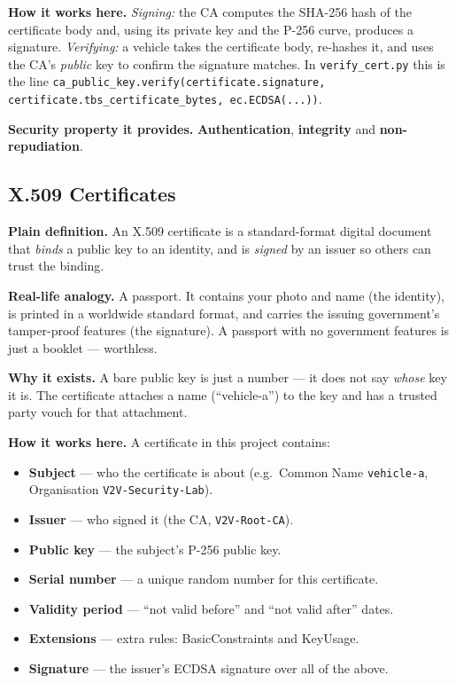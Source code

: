\documentclass[11pt,a4paper]{article}
\begin{document}
\textbf{How it works here.} \emph{Signing:} the CA computes the SHA-256 hash of
the certificate body and, using its private key and the P-256 curve, produces a
signature. \emph{Verifying:} a vehicle takes the certificate body, re-hashes it,
and uses the CA's \emph{public} key to confirm the signature matches. In
\texttt{verify\_cert.py} this is the line
\texttt{ca\_public\_key.verify(certificate.signature,
certificate.tbs\_certificate\_bytes, ec.ECDSA(...))}.

\textbf{Security property it provides.} \textbf{Authentication},
\textbf{integrity} and \textbf{non-repudiation}.

\subsection{X.509 Certificates}
\textbf{Plain definition.} An X.509 certificate is a standard-format digital
document that \emph{binds} a public key to an identity, and is \emph{signed} by
an issuer so others can trust the binding.

\textbf{Real-life analogy.} A passport. It contains your photo and name (the
identity), is printed in a worldwide standard format, and carries the issuing
government's tamper-proof features (the signature). A passport with no government
features is just a booklet --- worthless.

\textbf{Why it exists.} A bare public key is just a number --- it does not say
\emph{whose} key it is. The certificate attaches a name (``vehicle-a'') to the
key and has a trusted party vouch for that attachment.

\textbf{How it works here.} A certificate in this project contains:
\begin{itemize}
  \item \textbf{Subject} --- who the certificate is about (e.g.\ Common Name
        \texttt{vehicle-a}, Organisation \texttt{V2V-Security-Lab}).
  \item \textbf{Issuer} --- who signed it (the CA, \texttt{V2V-Root-CA}).
  \item \textbf{Public key} --- the subject's P-256 public key.
  \item \textbf{Serial number} --- a unique random number for this certificate.
  \item \textbf{Validity period} --- ``not valid before'' and ``not valid
        after'' dates.
  \item \textbf{Extensions} --- extra rules: BasicConstraints and KeyUsage.
  \item \textbf{Signature} --- the issuer's ECDSA signature over all of the above.
\end{itemize}
\end{document}
